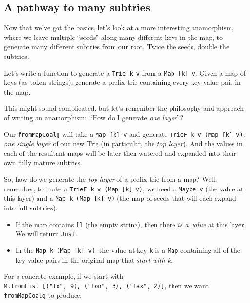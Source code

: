 \documentclass[]{article}
\begin{document}
\hypertarget{a-pathway-to-many-subtries}{%
\subsection{A pathway to many subtries}\label{a-pathway-to-many-subtries}}

Now that we've got the basics, let's look at a more interesting anamorphism,
where we leave multiple ``seeds'' along many different keys in the map, to
generate many different subtries from our root. Twice the seeds, double the
subtries.

Let's write a function to generate a \texttt{Trie\ k\ v} from a
\texttt{Map\ {[}k{]}\ v}: Given a map of keys (as token strings), generate a
prefix trie containing every key-value pair in the map.

This might sound complicated, but let's remember the philosophy and approach of
writing an anamorphism: ``How do I generate \emph{one layer}''?

Our \texttt{fromMapCoalg} will take a \texttt{Map\ {[}k{]}\ v} and generate
\texttt{TrieF\ k\ v\ (Map\ {[}k{]}\ v)}: \emph{one single layer} of our new Trie
(in particular, the \emph{top layer}). And the values in each of the resultant
maps will be later then watered and expanded into their own fully mature
subtries.

So, how do we generate the \emph{top layer} of a prefix trie from a map? Well,
remember, to make a \texttt{TrieF\ k\ v\ (Map\ {[}k{]}\ v)}, we need a
\texttt{Maybe\ v} (the value at this layer) and a
\texttt{Map\ k\ (Map\ {[}k{]}\ v)} (the map of seeds that will each expand into
full subtries).

\begin{itemize}
\tightlist
\item
  If the map contains \texttt{{[}{]}} (the empty string), then there \emph{is a
  value} at this layer. We will return \texttt{Just}.
\item
  In the \texttt{Map\ k\ (Map\ {[}k{]}\ v)}, the value at key \texttt{k} is a
  \texttt{Map} containing all of the key-value pairs in the original map that
  \emph{start with k}.
\end{itemize}

For a concrete example, if we start with
\texttt{M.fromList\ {[}("to",\ 9),\ ("ton",\ 3),\ ("tax",\ 2){]}}, then we want
\texttt{fromMapCoalg} to produce:
\end{document}
